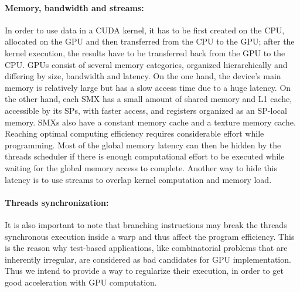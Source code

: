 \paragraph{Memory, bandwidth and streams:}

In order to use data in a CUDA kernel, it has to be first created on the CPU, allocated on the GPU and then transferred from the CPU to the GPU; after the kernel execution, the results have to be transferred back from the GPU to the CPU. 
GPUs consist of several memory categories, organized hierarchically and differing by size, bandwidth and latency.   
On the one hand, the device's main memory is relatively large but has a slow access time due to a huge latency. 
On the other hand, each SMX has a small amount of shared memory and L1 cache, accessible by its SPs, with faster access, and registers organized as an SP-local memory. 
SMXs also have a constant memory cache and a texture memory cache.
Reaching optimal computing efficiency requires considerable effort while programming.
Most of the global memory latency can then be hidden by the threads scheduler if there is enough computational effort to be executed while waiting for the global memory access to complete. Another way to hide this latency is to use streams to overlap kernel computation and memory load. 

\paragraph{Threads synchronization:}
It is also important to note that branching instructions may break the threads synchronous execution inside a warp and thus affect the program efficiency. 
This is the reason why test-based applications, like combinatorial problems that are inherently irregular, are considered as bad candidates for GPU implementation. 
Thus we intend to provide a way to regularize their execution, in order to get good acceleration with GPU computation. 

